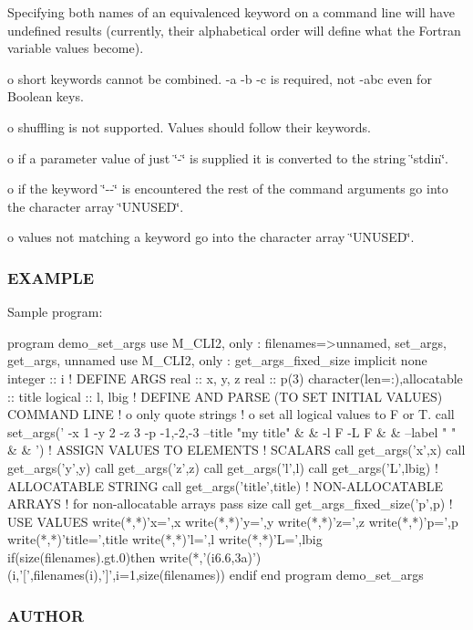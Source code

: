 Specifying both names of an equivalenced keyword on a command line will have undefined results (currently, their alphabetical order will define what the Fortran variable values become).

o short keywords cannot be combined. -\/a -\/b -\/c is required, not -\/abc even for Boolean keys.

o shuffling is not supported. Values should follow their keywords.

o if a parameter value of just \char`\"{}-\/\char`\"{} is supplied it is converted to the string \char`\"{}stdin\char`\"{}.

o if the keyword \char`\"{}-\/-\/\char`\"{} is encountered the rest of the command arguments go into the character array \char`\"{}\+U\+N\+U\+S\+E\+D\char`\"{}.

o values not matching a keyword go into the character array \char`\"{}\+U\+N\+U\+S\+E\+D\char`\"{}.

\subsubsection*{E\+X\+A\+M\+P\+LE}

Sample program\+: \begin{DoxyVerb}program demo_set_args
use M_CLI2,  only : filenames=>unnamed, set_args, get_args, unnamed
use M_CLI2,  only : get_args_fixed_size
implicit none
integer                      :: i
! DEFINE ARGS
real                         :: x, y, z
real                         :: p(3)
character(len=:),allocatable :: title
logical                      :: l, lbig
!  DEFINE AND PARSE (TO SET INITIAL VALUES) COMMAND LINE
!   o only quote strings
!   o set all logical values to F or T.
call set_args(' -x 1 -y 2 -z 3 -p -1,-2,-3 --title "my title" &
        & -l F -L F &
        & --label " " &
        & ')
! ASSIGN VALUES TO ELEMENTS
! SCALARS
call get_args('x',x)
call get_args('y',y)
call get_args('z',z)
call get_args('l',l)
call get_args('L',lbig)
! ALLOCATABLE STRING
call get_args('title',title)
! NON-ALLOCATABLE ARRAYS
! for non-allocatable arrays pass size
call get_args_fixed_size('p',p)
! USE VALUES
write(*,*)'x=',x
write(*,*)'y=',y
write(*,*)'z=',z
write(*,*)'p=',p
write(*,*)'title=',title
write(*,*)'l=',l
write(*,*)'L=',lbig
if(size(filenames).gt.0)then
   write(*,'(i6.6,3a)')(i,'[',filenames(i),']',i=1,size(filenames))
endif
end program demo_set_args
\end{DoxyVerb}
 \subsubsection*{A\+U\+T\+H\+OR}

